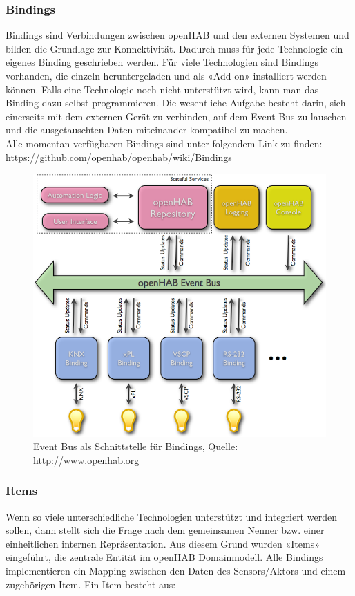 \subsubsection{Bindings}
Bindings sind Verbindungen zwischen openHAB und den externen Systemen und bilden die Grundlage zur Konnektivität. Dadurch muss für jede Technologie ein eigenes Binding geschrieben werden. Für viele Technologien sind Bindings vorhanden, die einzeln heruntergeladen und als «Add-on» installiert werden können. Falls eine Technologie noch nicht unterstützt wird, kann man das Binding dazu selbst programmieren. Die wesentliche Aufgabe besteht darin, sich einerseits mit dem externen Gerät zu verbinden, auf dem Event Bus zu lauschen und die ausgetauschten Daten miteinander kompatibel zu machen. \\
Alle momentan verfügbaren Bindings sind unter folgendem Link zu finden: \url{https://github.com/openhab/openhab/wiki/Bindings}

\begin{figure}[H]
	\centering
		\includegraphics[scale=0.4]{report/img/communicationOH}
	\caption{Event Bus als Schnittstelle für Bindings, Quelle: \url{http://www.openhab.org}	}
	\label{fig:ohComm}
\end{figure}



\subsubsection{Items}
Wenn so viele unterschiedliche Technologien unterstützt und integriert werden sollen, dann stellt sich die Frage nach dem gemeinsamen Nenner bzw. einer einheitlichen internen Repräsentation. Aus diesem Grund wurden «Items» eingeführt, die zentrale Entität im openHAB Domainmodell. Alle Bindings implementieren ein Mapping zwischen den Daten des Sensors/Aktors und einem zugehörigen Item. Ein Item besteht aus:

